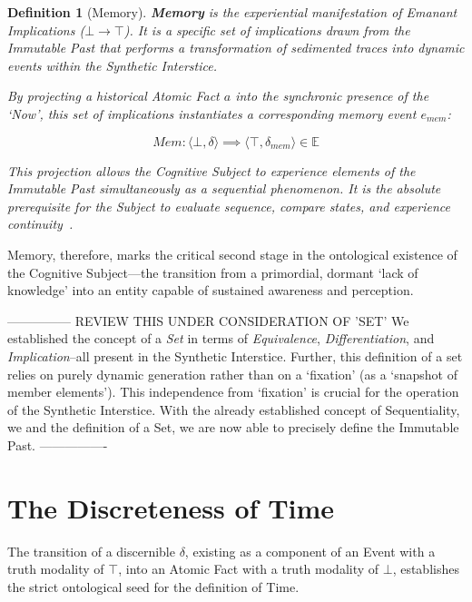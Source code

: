 \documentclass[11pt, a4paper]{article}
\theoremstyle{formalism}
\newtheorem{formalism}{Definition}
\begin{document}
\begin{formalism}[Memory]
    \textbf{Memory} is the experiential manifestation of \textit{Emanant
    Implications} ($\bot \rightarrow \top$). It is a specific set of implications
    drawn from the Immutable Past that performs a transformation of sedimented
    traces into dynamic events within the Synthetic Interstice. 
    
    By projecting a historical Atomic Fact $a$ into the synchronic presence of
    the `Now', this set of implications instantiates a corresponding memory
    event $e_{mem}$:
    
    \begin{equation}
        \mathit{Mem}: \langle \bot, \delta \rangle \implies \langle \top, \delta_{mem} \rangle \in \mathbb{E}
    \end{equation}
    
    This projection allows the Cognitive Subject to experience elements of
    the Immutable Past simultaneously as a sequential phenomenon. It is the 
    absolute prerequisite for the Subject to evaluate sequence, compare states, 
    and experience continuity~\cite{Husserl1928}.
\end{formalism}

Memory, therefore, marks the critical second stage in the ontological existence 
of the Cognitive Subject---the transition from a primordial, dormant `lack of 
knowledge' into an entity capable of sustained awareness and perception.

--------------- REVIEW THIS UNDER CONSIDERATION OF 'SET'
We established the concept of a \textit{Set} in terms of \textit{Equivalence},
\textit{Differentiation}, and \textit{Implication}--all present in the
Synthetic Interstice. Further, this definition of a set relies on purely
dynamic generation rather than on a `fixation' (as a `snapshot of member
elements'). This independence from `fixation' is crucial for the operation of
the Synthetic Interstice. With the already established concept of
Sequentiality, we and the definition of a Set, we are now able to precisely
define the Immutable Past.
----------------
\section{The Discreteness of Time}

The transition of a discernible $\delta$, existing as a component of an Event
with a truth modality of $\top$, into an Atomic Fact with a truth modality of
$\bot$, establishes the strict ontological seed for the definition of Time.
\end{document}
